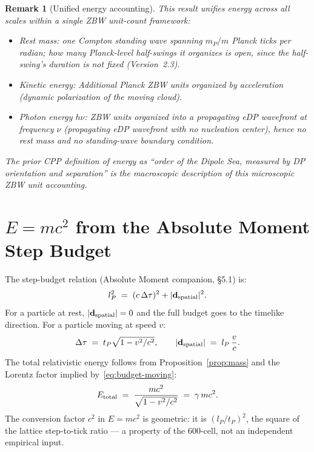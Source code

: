 \documentclass[12pt]{article}
\newtheorem{remark}[theorem]{Remark}
\newcommand{\lP}{l_P}
\newcommand{\tP}{t_P}
\newcommand{\mP}{m_P}
\begin{document}
\begin{remark}[Unified energy accounting]
This result unifies energy across all scales within a single ZBW unit-count
framework:
\begin{itemize}[noitemsep]
  \item \emph{Rest mass:} one Compton standing wave spanning $\mP/m$ Planck
    ticks per radian; how many Planck-level half-swings it organizes is open,
    since the half-swing's duration is not fixed (Version~2.3).
  \item \emph{Kinetic energy:} Additional Planck ZBW units organized by
    acceleration (dynamic polarization of the moving cloud).
  \item \emph{Photon energy $h\nu$:} ZBW units organized into a propagating
    eDP wavefront at frequency $\nu$ (propagating eDP wavefront with no
    nucleation center), hence no rest mass and no standing-wave boundary
    condition.
\end{itemize}
The prior CPP definition of energy as ``order of the Dipole Sea, measured
by DP orientation and separation'' is the macroscopic description of this
microscopic ZBW unit accounting.
\end{remark}

\section{\boldmath$E = mc^2$ from the Absolute Moment Step Budget}
\label{sec:emc2}

The step-budget relation (Absolute Moment companion, \S5.1) is:
\begin{equation}
  \lP^2 \;=\; (c\,\Delta\tau)^2 + |\mathbf{d}_{\rm spatial}|^2.
  \label{eq:budget}
\end{equation}
For a particle at rest, $|\mathbf{d}_{\rm spatial}|=0$ and the full budget
goes to the timelike direction.  For a particle moving at speed $v$:
\begin{equation}
  \Delta\tau \;=\; \tP\sqrt{1 - v^2/c^2},
  \qquad
  |\mathbf{d}_{\rm spatial}| \;=\; \lP\,\frac{v}{c}.
  \label{eq:budget-moving}
\end{equation}
The total relativistic energy follows from Proposition~\ref{prop:mass} and
the Lorentz factor implied by~\eqref{eq:budget-moving}:
\begin{equation}
  E_{\rm total} \;=\; \frac{mc^2}{\sqrt{1-v^2/c^2}} \;=\; \gamma\,mc^2.
  \label{eq:relativistic-energy}
\end{equation}
The conversion factor $c^2$ in $E = mc^2$ is geometric: it is
$(\lP/\tP)^2$, the square of the lattice step-to-tick ratio --- a property
of the 600-cell, not an independent empirical input.
\end{document}
